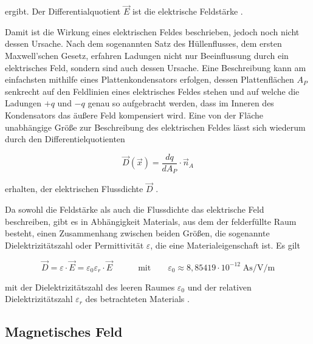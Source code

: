 ergibt. Der Differentialquotient $\vec E$ ist die elektrische Feldstärke \cite{EM_Schirmung}. \par
\vspace{\linespace}
Damit ist die Wirkung eines elektrischen Feldes beschrieben, jedoch noch nicht dessen Ursache. Nach dem sogenannten Satz des Hüllenflusses, dem ersten Maxwell'schen Gesetz, erfahren Ladungen nicht nur Beeinflussung durch ein elektrisches Feld, sondern sind auch dessen Ursache. Eine Beschreibung kann am einfachsten mithilfe eines Plattenkondensators erfolgen, dessen Plattenflächen $A_P$ senkrecht auf den Feldlinien eines elektrisches Feldes stehen und auf welche die Ladungen $+q$ und $-q$ genau so aufgebracht werden, dass im Inneren des Kondensators das äußere Feld kompensiert wird. Eine von der Fläche unabhängige Größe zur Beschreibung des elektrischen Feldes lässt sich wiederum durch den Differentielquotienten 

\begin{equation}
    \vec D(\vec x) = \frac{dq}{dA_P} \cdot \vec n_A
\end{equation}

erhalten, der elektrischen Flussdichte $\vec D$ \cite{EM_Schirmung}. \par
\vspace{\linespace}

Da sowohl die Feldstärke als auch die Flussdichte das elektrische Feld beschreiben, gibt es in Abhängigkeit Materials, aus dem der felderfüllte Raum besteht, einen Zusammenhang zwischen beiden Größen, die sogenannte Dielektrizitätszahl oder Permittivität $\varepsilon$, die eine Materialeigenschaft ist. Es gilt

\begin{equation}
    \vec D = \varepsilon \cdot \vec E = \varepsilon_0 \varepsilon_r \cdot \vec E \qquad \quad \text{mit} \qquad \varepsilon_0 \approx 8,85419 \cdot 10^{-12} \; \si{\ampere\second\per\volt\per\meter}
    \label{eq:2_Materialgleichung_elektrisches_Feld}
\end{equation}

mit der Dielektrizitätszahl des leeren Raumes $\varepsilon_0$ und der relativen Dielektrizitätszahl $\varepsilon_r$ des betrachteten Materials \cite{EM_Schirmung}.


\subsection{Magnetisches Feld}\label{cha:2_sub_Magnetisches_Feld}

